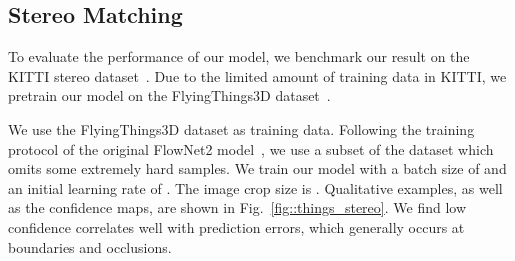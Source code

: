 \subsection{Stereo Matching}
To evaluate the performance of our \stereomodelname model, we benchmark our result on the KITTI stereo dataset~\cite{geiger2013vision}. Due to the limited amount of training data in KITTI, we pretrain our model on the FlyingThings3D dataset~\cite{dispnet}.

We use the FlyingThings3D dataset as training data. 
Following the training protocol of the original FlowNet2 model~\cite{ilg2017flownet}, we use a subset of the dataset which omits some extremely hard samples.
We train our model with a batch size of  and an initial learning rate of . 
The image crop size is .
Qualitative examples, as well as the confidence maps, are shown in Fig.~\ref{fig::things_stereo}. We find low confidence correlates well with prediction errors, which generally occurs at boundaries and occlusions.

